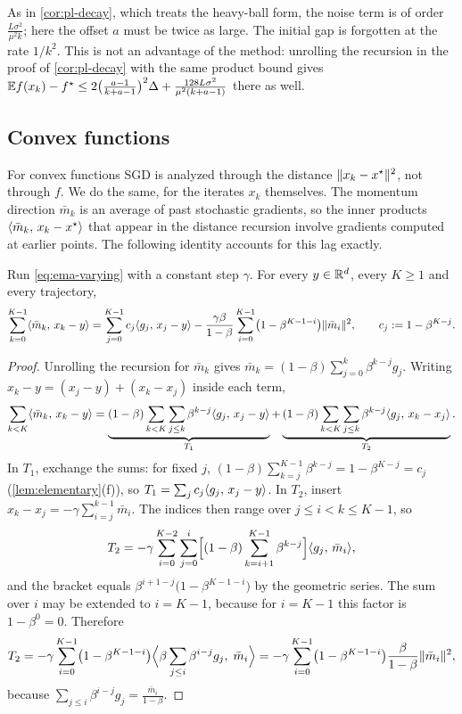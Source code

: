 As in \cref{cor:pl-decay}, which treats the heavy-ball form, the noise term is of order
$\frac{L\sigma^2}{\mu^2k}$; here the offset $a$ must be twice as large. The initial gap is
forgotten at the rate $1/k^2$. This is not an advantage of the method: unrolling the
recursion in the proof of \cref{cor:pl-decay} with the same product bound gives
$\mathbb{E} f(x_k)-f^\star\le2\bigl(\frac{a-1}{k+a-1}\bigr)^2\Delta+\frac{128L\sigma^2}{\mu^2(k+a-1)}$ there as well.

\subsection{Convex functions}

For convex functions SGD is analyzed through the distance $\lVert x_k-x^\star\rVert^2$, not
through $f$. We do the same, for the iterates $x_k$ themselves. The momentum direction
$\bar m_k$ is an average of past stochastic gradients, so the inner products
$\langle \bar m_k,\, x_k-x^\star\rangle$ that appear in the distance recursion involve gradients
computed at earlier points. The following identity accounts for this lag exactly.

\begin{lemma}\label{lem:lag-identity}
Run \eqref{eq:ema-varying} with a constant step $\gamma$. For every $y\in\mathbb{R}^d$, every
$K\ge1$ and every trajectory,
\[
  \sum_{k=0}^{K-1}\langle \bar m_k,\, x_k-y\rangle
  =\sum_{j=0}^{K-1}c_j\langle g_j,\, x_j-y\rangle-\frac{\gamma\beta}{1-\beta}\sum_{i=0}^{K-1}\bigl(1-\beta^{K-1-i}\bigr)\lVert \bar m_i\rVert^2,
  \qquad c_j:=1-\beta^{K-j}.
\]
\end{lemma}

\begin{proof}
Unrolling the recursion for $\bar m_k$ gives $\bar m_k=(1-\beta)\sum_{j=0}^k\beta^{k-j}g_j$.
Writing $x_k-y=(x_j-y)+(x_k-x_j)$ inside each term,
\[
  \sum_{k<K}\langle \bar m_k,\, x_k-y\rangle
  =\underbrace{(1-\beta)\sum_{k<K}\sum_{j\le k}\beta^{k-j}\langle g_j,\, x_j-y\rangle}_{T_1}
  +\underbrace{(1-\beta)\sum_{k<K}\sum_{j\le k}\beta^{k-j}\langle g_j,\, x_k-x_j\rangle}_{T_2}.
\]
In $T_1$, exchange the sums: for fixed $j$, $(1-\beta)\sum_{k=j}^{K-1}\beta^{k-j}=1-\beta^{K-j}=c_j$
(\cref{lem:elementary}(f)), so $T_1=\sum_jc_j\langle g_j,\, x_j-y\rangle$. In $T_2$, insert
$x_k-x_j=-\gamma\sum_{i=j}^{k-1}\bar m_i$. The indices then range over $j\le i<k\le K-1$, so
\[
  T_2=-\gamma\sum_{i=0}^{K-2}\sum_{j=0}^{i}\Bigl[(1-\beta)\sum_{k=i+1}^{K-1}\beta^{k-j}\Bigr]\langle g_j,\, \bar m_i\rangle,
\]
and the bracket equals $\beta^{i+1-j}\bigl(1-\beta^{K-1-i}\bigr)$ by the geometric series. The
sum over $i$ may be extended to $i=K-1$, because for $i=K-1$ this factor is
$1-\beta^0=0$. Therefore
\[
  T_2=-\gamma\sum_{i=0}^{K-1}\bigl(1-\beta^{K-1-i}\bigr)\Bigl\langle\beta\sum_{j\le i}\beta^{i-j}g_j,\;\bar m_i\Bigr\rangle
  =-\gamma\sum_{i=0}^{K-1}\bigl(1-\beta^{K-1-i}\bigr)\frac{\beta}{1-\beta}\lVert \bar m_i\rVert^2,
\]
because $\sum_{j\le i}\beta^{i-j}g_j=\frac{\bar m_i}{1-\beta}$.
\end{proof}

